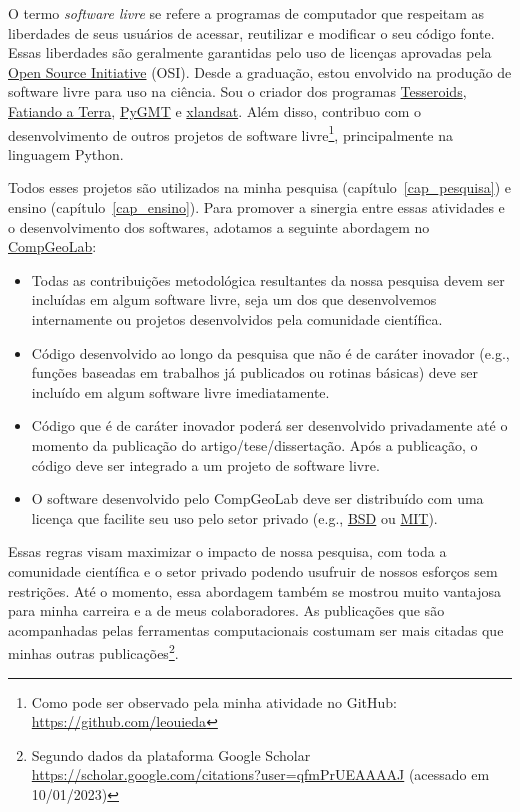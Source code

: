 \documentclass[10pt,a4paper,oneside]{book}
\begin{document}
O termo \textit{software livre} se refere a programas de computador que
respeitam as liberdades de seus usuários de acessar, reutilizar e modificar o
seu código fonte.
Essas liberdades são geralmente garantidas pelo uso de licenças aprovadas pela
\href{https://opensource.org/}{Open Source Initiative} (OSI).
Desde a graduação, estou envolvido na produção de software livre para uso na
ciência.
Sou o criador dos programas
\href{https://tesseroids.leouieda.com}{Tesseroids},
\href{https://www.fatiando.org}{Fatiando a Terra},
\href{https://www.pygmt.org}{PyGMT} e
\href{https://www.compgeolab.org/xlandsat}{xlandsat}.
Além disso, contribuo com o desenvolvimento de outros projetos de software
livre\footnote{Como pode ser observado pela minha atividade no GitHub:
\url{https://github.com/leouieda}}, principalmente na linguagem Python.

Todos esses projetos são utilizados na minha pesquisa
(capítulo~\ref{cap_pesquisa}) e ensino (capítulo~\ref{cap_ensino}).
Para promover a sinergia entre essas atividades e o desenvolvimento dos
softwares, adotamos a seguinte abordagem no
\href{https://www.compgeolab.org/}{CompGeoLab}:

\begin{itemize}
  \item Todas as contribuições metodológica resultantes da nossa pesquisa devem
    ser incluídas em algum software livre, seja um dos que desenvolvemos
    internamente ou projetos desenvolvidos pela comunidade científica.
  \item Código desenvolvido ao longo da pesquisa que não é de caráter
    inovador (e.g., funções baseadas em trabalhos já publicados ou rotinas
    básicas) deve ser incluído em algum software livre imediatamente.
  \item Código que é de caráter inovador poderá ser desenvolvido privadamente
    até o momento da publicação do artigo/tese/dissertação. Após a publicação,
    o código deve ser integrado a um projeto de software livre.
  \item O software desenvolvido pelo CompGeoLab deve ser distribuído com uma
    licença que facilite seu uso pelo setor privado (e.g.,
    \href{https://opensource.org/licenses/BSD-3-Clause}{BSD} ou
    \href{https://opensource.org/licenses/MIT}{MIT}).
\end{itemize}

Essas regras visam maximizar o impacto de nossa pesquisa, com toda a comunidade
científica e o setor privado podendo usufruir de nossos esforços sem
restrições.
Até o momento, essa abordagem também se mostrou muito vantajosa para minha
carreira e a de meus colaboradores.
As publicações que são acompanhadas pelas ferramentas computacionais
\citep[e.g.,][]{Uieda2016,Uieda2017} costumam ser mais citadas que minhas
outras publicações\footnote{Segundo dados da plataforma Google Scholar
\url{https://scholar.google.com/citations?user=qfmPrUEAAAAJ} (acessado em
10/01/2023)}.
\end{document}
